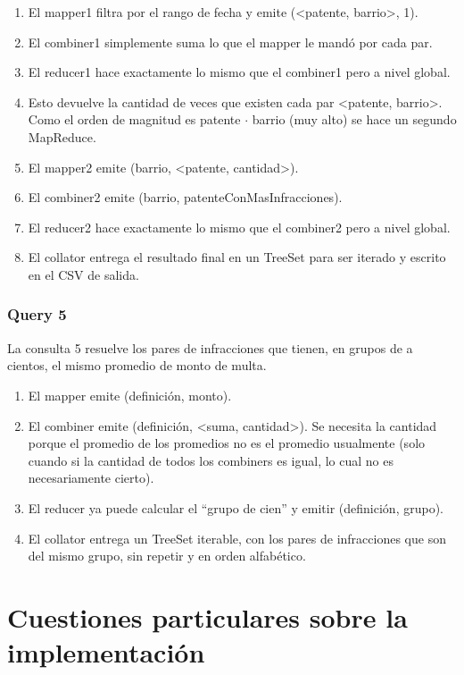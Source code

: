 \documentclass[a4paper,12pt]{article}
\begin{document}
	\begin{enumerate}
		\item El mapper1 filtra por el rango de fecha y emite (<patente, barrio>, 1).
		\item El combiner1 simplemente suma lo que el mapper le mandó por cada par.
		\item El reducer1 hace exactamente lo mismo que el combiner1 pero a nivel global.
		\item Esto devuelve la cantidad de veces que existen cada par <patente, barrio>. Como el orden de magnitud es patente $\cdot$ barrio (muy alto) se hace un segundo MapReduce.
		\item El mapper2 emite (barrio, <patente, cantidad>).
		\item El combiner2 emite (barrio, patenteConMasInfracciones).
		\item El reducer2 hace exactamente lo mismo que el combiner2 pero a nivel global.
		\item El collator entrega el resultado final en un TreeSet para ser iterado y escrito en el CSV de salida.
	\end{enumerate}

	\subsubsection{Query 5}
	
	La consulta 5 resuelve los pares de infracciones que tienen, en grupos de a cientos, el mismo promedio de monto de multa.
	
	\begin{enumerate}
		\item El mapper emite (definición, monto).
		\item El combiner emite (definición, <suma, cantidad>). Se necesita la cantidad porque el promedio de los promedios no es el promedio usualmente (solo cuando si la cantidad de todos los combiners es igual, lo cual no es necesariamente cierto).
		\item El reducer ya puede calcular el ``grupo de cien'' y emitir (definición, grupo).
		\item El collator entrega un TreeSet iterable, con los pares de infracciones que son del mismo grupo, sin repetir y en orden alfabético.
	\end{enumerate}

	\newpage
	
	\section{Cuestiones particulares sobre la implementación}
	
\end{document}
